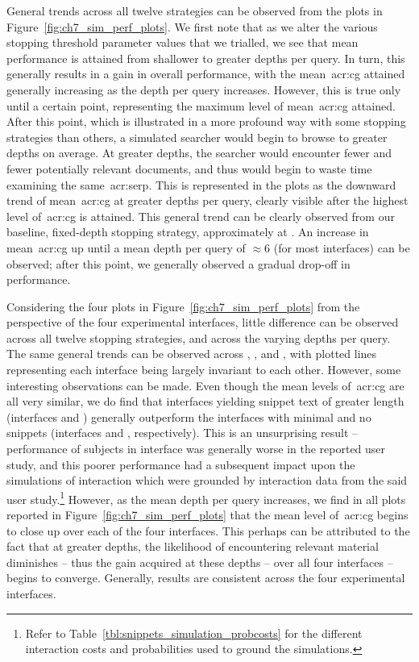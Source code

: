General trends across all twelve strategies can be observed from the plots in Figure~\ref{fig:ch7_sim_perf_plots}. We first note that as we alter the various stopping threshold parameter values that we trialled, we see that mean performance is attained from shallower to greater depths per query. In turn, this generally results in a gain in overall performance, with the mean~\gls{acr:cg} attained generally increasing as the depth per query increases. However, this is true only until a certain point, representing the maximum level of mean~\gls{acr:cg} attained. After this point, which is illustrated in a more profound way with some stopping strategies than others, a simulated searcher would begin to browse to greater depths on average. At greater depths, the searcher would encounter fewer and fewer potentially relevant documents, and thus would begin to waste time examining the same~\gls{acr:serp}. This is represented in the plots as the downward trend of mean~\gls{acr:cg} at greater depths per query, clearly visible after the highest level of~\gls{acr:cg} is attained. This general trend can be clearly observed from our baseline, fixed-depth stopping strategy, approximately at . An increase in mean~\gls{acr:cg} up until a mean depth per query of $\approx6$ (for most interfaces) can be observed; after this point, we generally observed a gradual drop-off in performance.

    Considering the four plots in Figure~\ref{fig:ch7_sim_perf_plots} from the perspective of the four experimental interfaces, little difference can be observed across all twelve stopping strategies, and across the varying depths per query. The same general trends can be observed across , ,  and , with plotted lines representing each interface being largely invariant to each other. However, some interesting observations can be made. Even though the mean levels of~\gls{acr:cg} are all very similar, we do find that interfaces yielding snippet text of greater length (interfaces  and ) generally outperform the interfaces with minimal and no snippets (interfaces  and , respectively). This is an unsurprising result -- performance of subjects in interface  was generally worse in the reported user study, and this poorer performance had a subsequent impact upon the simulations of interaction which were grounded by interaction data from the said user study.\footnote{Refer to Table~\ref{tbl:snippets_simulation_probcosts} for the different interaction costs and probabilities used to ground the simulations.} However, as the mean depth per query increases, we find in all plots reported in Figure~\ref{fig:ch7_sim_perf_plots} that the mean level of~\gls{acr:cg} begins to close up over each of the four interfaces. This perhaps can be attributed to the fact that at greater depths, the likelihood of encountering relevant material diminishes -- thus the gain acquired at these depths -- over all four interfaces -- begins to converge. Generally, results are consistent across the four experimental interfaces.


